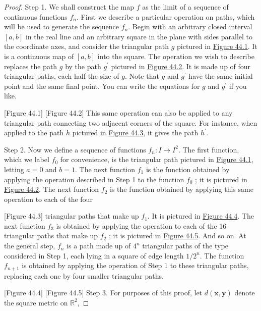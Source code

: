 \begin{proof}
Step 1. We shall construct the map \(f\) as the limit of a sequence of continuous functions \(f_{n}\). First we describe a particular operation on paths, which will be used to generate the sequence \(f_{n}\).
Begin with an arbitrary closed interval \([ {a,b}]\) in the real line and an arbitrary square in the plane with sides parallel to the coordinate axes, and consider the triangular path \(g\) pictured in \hyperref[fig:44.1]{Figure 44.1}. It is a continuous map of \([ {a,b}]\) into the square. The operation we wish to describe replaces the path \(g\) by the path \(g^{\prime }\) pictured in \hyperref[fig:44.2]{Figure 44.2}. It is made up of four triangular paths, each half the size of \(g\). Note that \(g\) and \(g^{\prime }\) have the same initial point and the same final point. You can write the equations for \(g\) and \(g^{\prime }\) if you like.

[Figure 44.1]
[Figure 44.2]
This same operation can also be applied to any triangular path connecting two adjacent corners of the square. For instance, when applied to the path \(h\) pictured in \hyperref[fig:44.3]{Figure 44.3}, it gives the path \(h^{\prime }\).

Step 2. Now we define a sequence of functions \(f_{n} : I \rightarrow {I}^{2}\). The first function, which we label \(f_{0}\) for convenience, is the triangular path pictured in \hyperref[fig:44.1]{Figure 44.1}, letting \(a = 0\) and \(b = 1\). The next function \(f_{1}\) is the function obtained by applying the operation described in Step 1 to the function \(f_{0}\) ; it is pictured in \hyperref[fig:44.2]{Figure 44.2}. The next function \(f_{2}\) is the function obtained by applying this same operation to each of the four

[Figure 44.3]
triangular paths that make up \(f_{1}\). It is pictured in \hyperref[fig:44.4]{Figure 44.4}. The next function \(f_{3}\) is obtained by applying the operation to each of the 16 triangular paths that make up \(f_{2}\) ; it is pictured in \hyperref[fig:44.5]{Figure 44.5}. And so on. At the general step, \(f_{n}\) is a path made up of \(4^{n}\) triangular paths of the type considered in Step 1, each lying in a square of edge length \(1/2^{n}\). The function \(f_{n + 1}\) is obtained by applying the operation of Step 1 to these triangular paths, replacing each one by four smaller triangular paths.

[Figure 44.4]
[Figure 44.5]
Step 3. For purposes of this proof, let \(d({\mathbf{x},\mathbf{y}})\) denote the square metric on \(\mathbb{R}^{2}\),


\end{proof}
